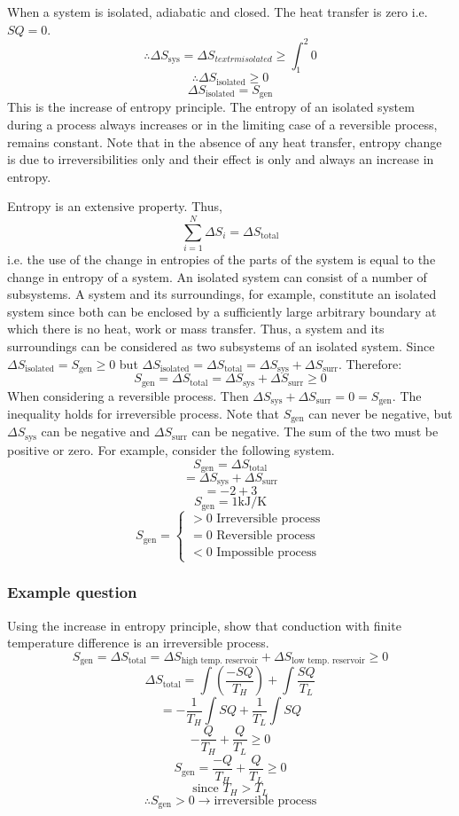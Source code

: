 \documentclass[class=report, crop=false, 12pt,a4paper]{standalone}
\begin{document}
When a system is isolated, adiabatic and closed. The heat transfer is zero i.e. \(SQ = 0\).
\[ \therefore \Delta S_{\textrm{sys}} = \Delta S_{textrm{isolated}} \geq \int_1^2 0 \]
\[ \therefore \Delta S_{\textrm{isolated}} \geq 0 \]
\[ \Delta S_{\textrm{isolated}} = S_{\textrm{gen}} \]
This is the increase of entropy principle. The entropy of an isolated system during a process always increases or in the limiting case of a reversible process, remains constant. Note that in the absence of any heat transfer, entropy change is due to irreversibilities only and their effect is only and always an increase in entropy.

Entropy is an extensive property. Thus, 
\[ \sum^N_{i=1} \Delta S_i = \Delta S_{\textrm{total}} \]
i.e. the use of the change in entropies of the parts of the system is equal to the change in entropy of a system. An isolated system can consist of a number of subsystems. A system and its surroundings, for example, constitute an isolated system since both can be enclosed by a sufficiently large arbitrary boundary at which there is no heat, work or mass transfer. Thus, a system and its surroundings can be considered as two subsystems of an isolated system. Since \( \Delta S_{\textrm{isolated}} = S_{\textrm{gen}} \geq 0 \) but \( \Delta S_{\textrm{isolated}} = \Delta S_{\textrm{total}} = \Delta S_{\textrm{sys}} + \Delta S_{\textrm{surr}} \). Therefore:
\[ S_{\textrm{gen}} = \Delta S_{\textrm{total}} = \Delta S_{\textrm{sys}} + \Delta S_{\textrm{surr}} \geq 0 \]
When considering a reversible process. Then \( \Delta S_{\textrm{sys}} + \Delta S_{\textrm{surr}} = 0 = S_{\textrm{gen}} \). The inequality holds for irreversible process. Note that \( S_{\textrm{gen}}\) can never be negative, but \( \Delta S_{\textrm{sys}} \) can be negative and \( \Delta S_{\textrm{surr}} \) can be negative. The sum of the two must be positive or zero. For example, consider the following system. 
\[ S_{\textrm{gen}} = \Delta S_{\textrm{total}} \]
\[ = \Delta S_{\textrm{sys}} + \Delta S_{\textrm{surr}}\]
\[ = -2 + 3 \]
\[ S_{\textrm{gen}} = 1 \si{\kilo\joule\per\kelvin} \]
\[ S_{\textrm{gen}} = \begin{cases}
  > 0 \textrm{ Irreversible process}\\
  = 0 \textrm{ Reversible process}\\
  < 0 \textrm{ Impossible process}
\end{cases}
\]
\subsubsection{Example question}
Using the increase in entropy principle, show that conduction with finite temperature difference is an irreversible process. 
\[ S_{\textrm{gen}} = \Delta S_{\textrm{total}} = \Delta S_{\textrm{high temp. reservoir}} + \Delta S_{\textrm{low temp. reservoir}} \geq 0\]
\[ \Delta S_{\textrm{total}} = \int \left( \frac{-SQ}{T_H} \right) + \int \frac{SQ}{T_L} \]
\[ = -\frac{1}{T_H} \int SQ + \frac{1}{T_L} \int SQ \]
\[ -\frac{Q}{T_H} + \frac{Q}{T_L} \geq 0 \]
\[ S_{\textrm{gen}} = \frac{-Q}{T_H} + \frac{Q}{T_L} \geq 0 \]
\[ \textrm{since } T_H > T_L \]
\[ \therefore S_{\textrm{gen}} > 0 \rightarrow \textrm{irreversible process} \]
\end{document}
